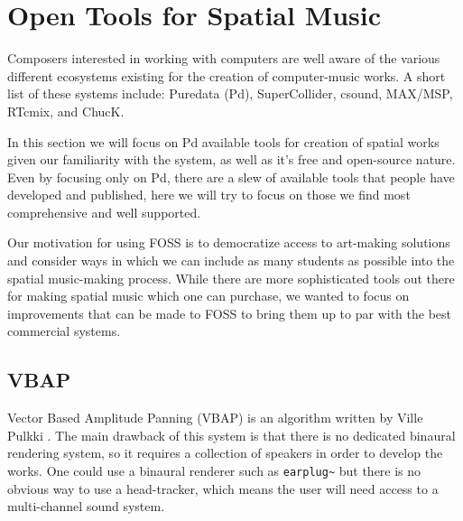 


\section{Open Tools for Spatial Music} \label{sec:open_tools_spat_mus}

Composers interested in working with computers are well aware of the various different ecosystems existing for the creation of computer-music works. A short list of these systems include: Puredata (Pd), SuperCollider, csound, MAX/MSP, RTcmix, and ChucK. 

In this section we will focus on Pd available tools for creation of spatial works given our familiarity with the system, as well as it's free and open-source nature. Even by focusing only on Pd, there are a slew of available tools that people have developed and published, here we will try to focus on those we find most comprehensive and well supported. 

Our motivation for using FOSS is to democratize access to art-making solutions and consider ways in which we can include as many students as possible into the spatial music-making process. While there are more sophisticated tools out there for making spatial music which one can purchase, we wanted to focus on improvements that can be made to FOSS to bring them up to par with the best commercial systems. 

\subsection{VBAP} 
Vector Based Amplitude Panning (VBAP) is an algorithm written by Ville Pulkki \cite{pulkki1997virtual}. The main drawback of this system is that there is no dedicated binaural rendering system, so it requires a collection of speakers in order to develop the works. One could use a binaural renderer such as \texttt{earplug\~} but there is no obvious way to use a head-tracker, which means the user will need access to a multi-channel sound system. 

